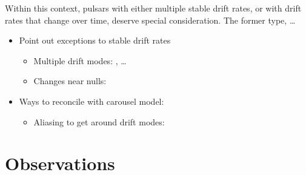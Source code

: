 \documentclass[linenumbers]{aastex631}
\begin{document}
Within this context, pulsars with either multiple stable drift rates, or with drift rates that change over time, deserve special consideration.
The former type, \dots

\begin{itemize}
    \item Point out exceptions to stable drift rates
    \begin{itemize}
        \item Multiple drift modes: \citep{Hankins1987}, \dots
        \item Changes near nulls: \citep{Lyne1983,VanLeeuwen2002,VanLeeuwen2003}
    \end{itemize}
    \item Ways to reconcile with carousel model:
    \begin{itemize}
        \item Aliasing to get around drift modes: \citep{Rankin2013,McSweeney2019a}
    \end{itemize}
\end{itemize}




\section{Observations} \label{sec:observations}
\end{document}
